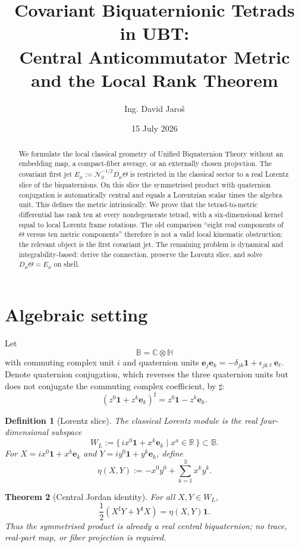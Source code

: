 \documentclass[12pt]{article}
\title{Covariant Biquaternionic Tetrads in UBT:\\Central Anticommutator Metric and the Local Rank Theorem}
\author{Ing. David Jaroš}
\date{15 July 2026}
\newtheorem{definition}{Definition}[section]
\newtheorem{theorem}[definition]{Theorem}
\theoremstyle{remark}\newtheorem{remark}[definition]{Remark}
\begin{document}
\maketitle
\UBTProvenanceNotice
\begin{abstract}
We formulate the local classical geometry of Unified Biquaternion Theory without
an embedding map, a compact-fiber average, or an externally chosen projection.
The covariant first jet $E_\mu:=\mathcal N_0^{-1/2}D_\mu\Theta$ is restricted in
the classical sector to a real Lorentz slice of the biquaternions.  On this
slice the symmetrised product with quaternion conjugation is automatically
central and equals a Lorentzian scalar times the algebra unit.  This defines
the metric intrinsically.  We prove that the tetrad-to-metric differential has
rank ten at every nondegenerate tetrad, with a six-dimensional kernel equal to
local Lorentz frame rotations.  The old comparison ``eight real components of
$\Theta$ versus ten metric components'' therefore is not a valid local
kinematic obstruction: the relevant object is the first covariant jet.  The
remaining problem is dynamical and integrability-based: derive the connection,
preserve the Lorentz slice, and solve $D_\mu\Theta=E_\mu$ on shell.
\end{abstract}

\section{Algebraic setting}
Let
\[
 \mathbb B=\mathbb C\otimes\mathbb H
\]
with commuting complex unit $i$ and quaternion units
$\mathbf e_j\mathbf e_k=-\delta_{jk}\mathbf1+\epsilon_{jk\ell}\mathbf e_\ell$.
Denote quaternion conjugation, which reverses the three quaternion units but
does not conjugate the commuting complex coefficient, by $\sharp$:
\[
 (z^0\mathbf1+z^k\mathbf e_k)^\sharp
 =z^0\mathbf1-z^k\mathbf e_k.
\]

\begin{definition}[Lorentz slice]
The classical Lorentz module is the real four-dimensional subspace
\[
 W_L:=\{\,i x^0\mathbf1+x^k\mathbf e_k\mid x^a\in\mathbb R\,\}
 \subset\mathbb B.
\]
For $X=i x^0\mathbf1+x^k\mathbf e_k$ and
$Y=i y^0\mathbf1+y^k\mathbf e_k$, define
\[
 \eta(X,Y):=-x^0y^0+\sum_{k=1}^3x^ky^k.
\]
\end{definition}

\begin{theorem}[Central Jordan identity]
For all $X,Y\in W_L$,
\begin{equation}
 \boxed{\frac12\left(X^\sharp Y+Y^\sharp X\right)
       =\eta(X,Y)\mathbf1.}
 \label{eq:central-jordan}
\end{equation}
Thus the symmetrised product is already a real central biquaternion; no trace,
real-part map, or fiber projection is required.
\end{theorem}
\end{document}
